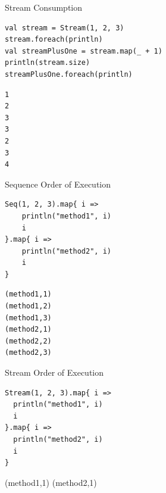 \documentclass[xcolor=svgnames]{beamer}
\begin{document}
    \begin{frame}[fragile] %
    {Stream Consumption}
        \begin{Verbatim}[formatcom=\sffamily]
val stream = Stream(1, 2, 3)
stream.foreach(println)
val streamPlusOne = stream.map(_ + 1)
println(stream.size)
streamPlusOne.foreach(println)
        \end{Verbatim}

        \noindent\makebox[\linewidth]{\rule{\paperwidth}{0.4pt}}

        \pause

        \begin{Verbatim}[formatcom=\sffamily]
1
2
3
3
2
3
4
        \end{Verbatim}
    \end{frame}

    \begin{frame}[fragile] %
    {Sequence Order of Execution}
        \begin{Verbatim}[formatcom=\sffamily]
Seq(1, 2, 3).map{ i =>
    println("method1", i)
    i
}.map{ i =>
    println("method2", i)
    i
}
        \end{Verbatim}

        \noindent\makebox[\linewidth]{\rule{\paperwidth}{0.4pt}}

        \pause

        \begin{Verbatim}[formatcom=\sffamily]
(method1,1)
(method1,2)
(method1,3)
(method2,1)
(method2,2)
(method2,3)
        \end{Verbatim}
    \end{frame}

    \begin{frame}[fragile] %
    {Stream Order of Execution}
        \begin{Verbatim}[formatcom=\sffamily]
Stream(1, 2, 3).map{ i =>
  println("method1", i)
  i
}.map{ i =>
  println("method2", i)
  i
}
        \end{Verbatim}

        \noindent\makebox[\linewidth]{\rule{\paperwidth}{0.4pt}}
(method1,1)
(method2,1)
        \pause

        \begin{Verbatim}[formatcom=\sffamily]

        \end{Verbatim}
    \end{frame}
\end{document}
